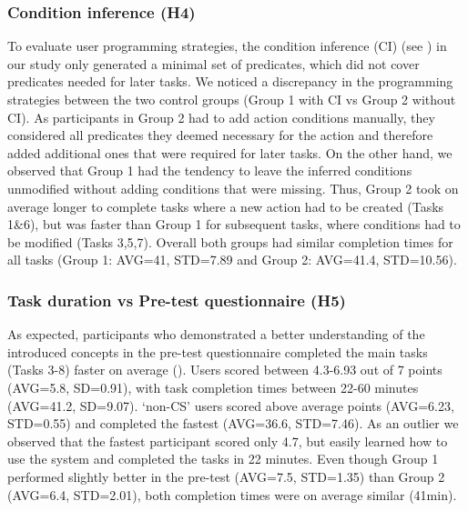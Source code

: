\subsubsection{Condition inference (H4)} 
To evaluate user programming strategies, the condition inference (CI) (see ) in our study only generated a minimal set of predicates, which did not cover predicates needed for later tasks.
We noticed a discrepancy in the programming strategies between the two control groups (Group 1 with CI vs Group 2 without CI).
As participants in Group 2 had to add action conditions manually, they considered all predicates they deemed necessary for the action and therefore added additional ones that were required for later tasks.
On the other hand, we observed that Group 1 had the tendency to leave the inferred conditions unmodified without adding conditions that were missing.
Thus, Group 2 took on average longer to complete tasks where a new action had to be created (Tasks 1\&6), but was faster than Group 1 for subsequent tasks, where conditions had to be modified (Tasks 3,5,7).
Overall both groups had similar completion times for all tasks (Group 1: AVG=41, STD=7.89 and Group 2: AVG=41.4, STD=10.56).

\subsubsection{Task duration vs Pre-test questionnaire (H5)} 
As expected, participants who demonstrated a better understanding of the introduced concepts in the pre-test questionnaire completed the main tasks (Tasks 3-8) faster on average ().
Users scored between 4.3-6.93 out of 7 points (AVG=5.8, SD=0.91), with task completion times between 22-60 minutes (AVG=41.2, SD=9.07).
`non-CS' users scored above average points (AVG=6.23, STD=0.55) and completed the fastest (AVG=36.6, STD=7.46).
As an outlier we observed that the fastest participant scored only 4.7, but easily learned how to use the system and completed the tasks in 22 minutes.
Even though Group 1 performed slightly better in the pre-test (AVG=7.5, STD=1.35) than Group 2 (AVG=6.4, STD=2.01), both completion times were on average similar (41min).

